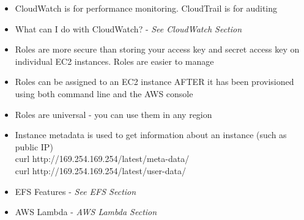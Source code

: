 \documentclass{article}
\begin{document}
\begin{itemize}
\item
CloudWatch is for performance monitoring. CloudTrail is for auditing

\item
What can I do with CloudWatch? -\textit{ See CloudWatch Section}

\item
Roles are more secure than storing your access key and secret access key on individual EC2 instances. Roles are easier to manage

\item
Roles can be assigned to an EC2 instance AFTER it has been provisioned using both command line and the AWS console

\item
Roles are universal - you can use them in any region

\item
Instance metadata is used to get information about an instance (such as public IP) \\
curl http://169.254.169.254/latest/meta-data/ \\
curl http://169.254.169.254/latest/user-data/ \\

\item
EFS Features - \textit{See EFS Section}

\item
AWS Lambda - \textit{AWS Lambda Section}

\end{itemize}
\end{document}
